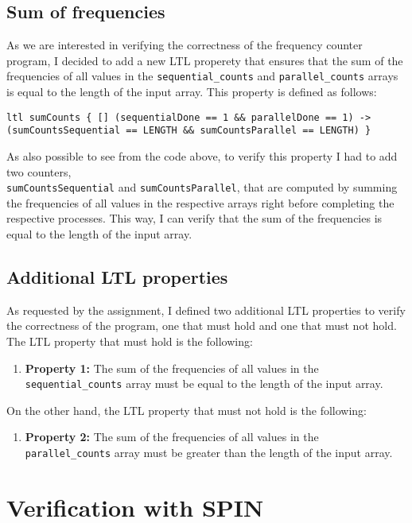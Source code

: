 \documentclass[a4paper, 11pt]{article}
\begin{document}
\subsection{Sum of frequencies}

As we are interested in verifying the correctness of the frequency counter program, I decided to add a new LTL properety that ensures that the sum of the frequencies of all values in the \texttt{sequential\_counts} and \texttt{parallel\_counts} arrays is equal to the length of the input array. This property is defined as follows:

\begin{lstlisting}[language=Promela, caption={LTL properties to verify the sum of frequencies in the sequential and parallel arrays}, captionpos=b, breaklines=true]
ltl sumCounts { [] (sequentialDone == 1 && parallelDone == 1) -> (sumCountsSequential == LENGTH && sumCountsParallel == LENGTH) }
\end{lstlisting}

As also possible to see from the code above, to verify this property I had to add two counters, \\ \texttt{sumCountsSequential} and \texttt{sumCountsParallel}, that are computed by summing the frequencies of all values in the respective arrays right before completing the respective processes. This way, I can verify that the sum of the frequencies is equal to the length of the input array.

\subsection{Additional LTL properties}

As requested by the assignment, I defined two additional LTL properties to verify the correctness of the program, one that must hold and one that must not hold. The LTL property that must hold is the following:

\begin{enumerate}
	\item \textbf{Property 1:} The sum of the frequencies of all values in the \texttt{sequential\_counts} array must be equal to the length of the input array.
\end{enumerate}

On the other hand, the LTL property that must not hold is the following:

\begin{enumerate}
	\item \textbf{Property 2:} The sum of the frequencies of all values in the \texttt{parallel\_counts} array must be greater than the length of the input array.
\end{enumerate}


\pagebreak

\section{Verification with SPIN}

% 
\end{document}
